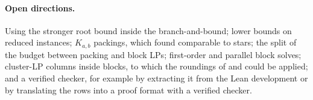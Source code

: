 \paragraph{Open directions.}  Using the stronger root bound inside the
branch-and-bound; lower bounds on reduced instances; $K_{a,b}$ packings, which
\citet{BlasiusEtAl22sea} found comparable to stars; the split of the budget
between packing and block LPs; first-order and parallel block solves;
cluster-LP columns inside blocks, to which the roundings of
\citet{CaoCLLNV24} and \citet{GarciaSorianoS26} could be applied; and a
verified checker, for example by extracting it from the Lean development or
by translating the rows into a proof format with a verified checker.
